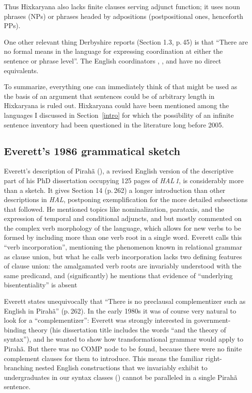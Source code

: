 \documentclass[output=paper,colorlinks,citecolor=brown
]{langscibook}
\begin{document}
\noindent
Thus Hixkaryana also lacks finite clauses serving adjunct function;
it uses noun phrases (NPs) or phrases headed by adpositions
(postpositional ones, henceforth PPs).

One other relevant thing Derbyshire reports (Section 1.3, p.\,45) is that
``There are no formal means in the language for expressing coordination at
either the sentence or phrase level''. The English coordinators ,
, and  have no direct equivalents.

To summarize, everything one can immediately think of that might be used
as the basis of an argument that sentences could be of arbitrary length
in Hixkaryana is ruled out. Hixkaryana could have been mentioned among
the languages I discussed in Section~\ref{intro} for which the possibility
of an infinite sentence inventory had been questioned in the literature
long before 2005.

\subsection{Everett's 1986 grammatical sketch}

Everett's description of Pirah{\~a} (\citeyear{Everett86HAL}), a revised
English version of the descriptive part of his PhD dissertation occupying
125 pages of \textit{HAL\,1}, is considerably more than a sketch. It
gives Section 14 (p.\,262) a longer introduction than other descriptions
in \textit{HAL}, postponing exemplification for the more detailed
subsections that followed. He mentioned topics like nominalization,
parataxis, and the expression of temporal and conditional adjuncts,
and but mostly commented on the complex verb morphology of the
language, which allows for new verbs to be formed by including more
than one verb root in a single word. Everett calls this ``verb
incorporation'', mentioning the phenomenon known in relational grammar
as clause union, but what he calls verb incorporation lacks two
defining features of clause union: the amalgamated verb roots are
invariably understood with the same predicand, and (significantly)
he mentions that evidence of ``underlying bisententiality'' is absent

Everett states unequivocally that ``There is no preclausal complementizer
such as English  in Pirah{\~a}'' (p.\,262). In the early 1980s
it was of course very natural to look for a ``complementizer'': Everett
was strongly interested in government-binding theory (his dissertation
title includes the words ``and the theory of syntax''), and he wanted to
show how transformational grammar would apply to Pirah{\~a}. But there
was no COMP node to be found, because there were no finite complement
clauses for them to introduce. This means the familiar right-branching
nested English constructions that we invariably exhibit to undergraduates
in our syntax classes ()
cannot be paralleled in a single Pirah{\~a} sentence.
\end{document}

